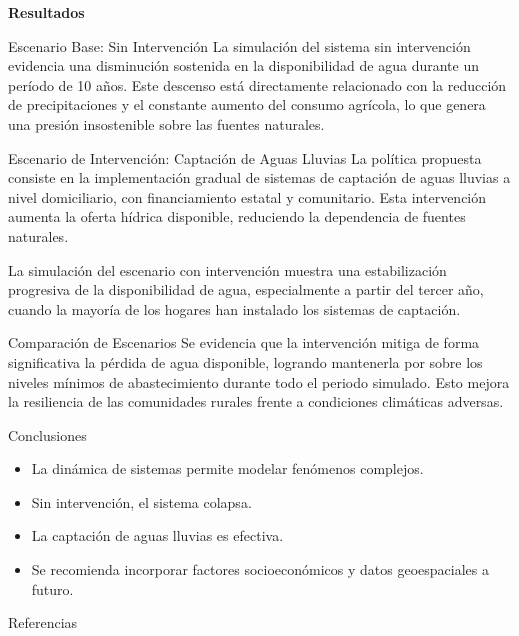 \documentclass[aspectratio=169]{beamer}
\begin{document}
\begin{frame}[plain]
    \centering
    {\Huge \textbf{Resultados}}
\end{frame}

\begin{frame}{Escenario Base: Sin Intervención}
La simulación del sistema sin intervención evidencia una disminución sostenida en la disponibilidad de agua durante un período de 10 años. Este descenso está directamente relacionado con la reducción de precipitaciones y el constante aumento del consumo agrícola, lo que genera una presión insostenible sobre las fuentes naturales.
\end{frame}

\begin{frame}{Escenario de Intervención: Captación de Aguas Lluvias}
La política propuesta consiste en la implementación gradual de sistemas de captación de aguas lluvias a nivel domiciliario, con financiamiento estatal y comunitario. Esta intervención aumenta la oferta hídrica disponible, reduciendo la dependencia de fuentes naturales.

La simulación del escenario con intervención muestra una estabilización progresiva de la disponibilidad de agua, especialmente a partir del tercer año, cuando la mayoría de los hogares han instalado los sistemas de captación.
\end{frame}

\begin{frame}{Comparación de Escenarios}
Se evidencia que la intervención mitiga de forma significativa la pérdida de agua disponible, logrando mantenerla por sobre los niveles mínimos de abastecimiento durante todo el periodo simulado. Esto mejora la resiliencia de las comunidades rurales frente a condiciones climáticas adversas.
\end{frame}

\begin{frame}{Conclusiones}
\begin{itemize}
    \item La dinámica de sistemas permite modelar fenómenos complejos.
    \item Sin intervención, el sistema colapsa.
    \item La captación de aguas lluvias es efectiva.
    \item Se recomienda incorporar factores socioeconómicos y datos geoespaciales a futuro.
\end{itemize}
\end{frame}

\begin{frame}[allowframebreaks]{Referencias}
\printbibliography
\end{frame}
\end{document}
